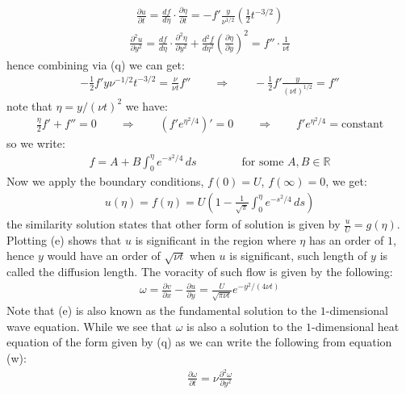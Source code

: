 \documentclass[11pt]{book}
\theoremstyle{break}
\theoremstyle{break}
\newcommand{\R}{\mathbb{R}}
\begin{document}
\begin{align*}
\frac{\partial u}{\partial t} = \frac{df}{d\eta} \cdot \frac{\partial \eta}{\partial t} =- f' \frac{y}{\nu^{1/2}}\left(\frac{1}{2} t^{-3/2}\right)
\end{align*}
\begin{align*}
\frac{\partial^2 u}{\partial y^2} = \frac{df}{d\eta}\cdot \frac{\partial^2 \eta}{\partial y^2} + \frac{d^2 f}{d\eta^2} \left( \frac{\partial \eta}{\partial y}\right)^2 = f'' \cdot \frac{1}{\nu t} 
\end{align*}
hence combining via (q) we can get:
\begin{align*}
-\frac{1}{2}f' y \nu^{-1/2}t^{-3/2} =\frac{\nu }{\nu t} f'' \qquad \Rightarrow \qquad -\frac{1}{2}f' \frac{y}{(\nu t)^{1/2}} = f''
\end{align*}
note that $\eta = y/(\nu t)^2$ we have:
\begin{align*}
\frac{\eta}{2}f' + f'' = 0 \qquad \Rightarrow \qquad (f' e^{\eta^2/4})' = 0\qquad \Rightarrow \qquad f'e^{\eta^2/4} = \text{constant}
\end{align*}
so we write:
\begin{align*}
f = A+ B \int_0^\eta e^{-s^2/4}\, ds\qquad\qquad \text{for some }A,B \in \R
\end{align*}
Now we apply the boundary conditions, $f(0) = U$, $f(\infty) = 0$, we get:
\begin{align*}
u(\eta) = f(\eta) = U\left( 1 - \frac{1}{\sqrt{\pi}} \int_0^\eta e^{-s^2/4}\, ds\right) \tag{e}
\end{align*}
the similarity solution states that other form of solution is given by $\frac{u}{U} = g\left(\eta\right)$. Plotting (e) shows that $u$ is significant in the region where $\eta$ has an order of $1$, hence $y$ would have an order of $\sqrt{\nu t}$ when $u$ is significant, such length of $y$ is called the diffusion length. The voracity of such flow is given by the following:
\begin{align*}
\omega = \frac{\partial v}{\partial x} - \frac{\partial u}{\partial y} = \frac{U}{\sqrt{\pi \nu t}}e^{-y^2 / (4\nu t)} \tag{w}
\end{align*}
Note that (e) is also known as the fundamental solution to the $1$-dimensional wave equation. While we see that $\omega$ is also a solution to the $1$-dimensional heat equation of the form given by (q) as we can write the following from equation (w):
\begin{align*}
\frac{\partial \omega}{\partial t} = \nu\frac{\partial^2 \omega}{\partial y^2}
\end{align*}
\end{document}
